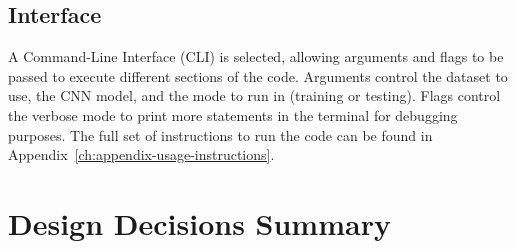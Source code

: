 \subsection{Interface}

A Command-Line Interface (CLI) is selected, allowing arguments and flags to be passed to execute different sections of the code. Arguments control the dataset to use, the CNN model, and the mode to run in (training or testing). Flags control the verbose mode to print more statements in the terminal for debugging purposes. The full set of instructions to run the code can be found in Appendix~\ref{ch:appendix-usage-instructions}.


\section{Design Decisions Summary}


